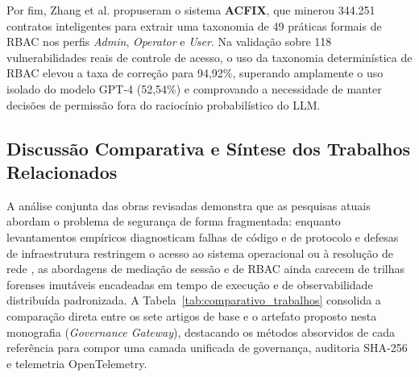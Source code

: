 Por fim, Zhang et al. \cite{zhang2025acfix} propuseram o sistema \textbf{ACFIX}, que minerou 344.251 contratos inteligentes para extrair uma taxonomia de 49 práticas formais de RBAC nos perfis \textit{Admin}, \textit{Operator} e \textit{User}. Na validação sobre 118 vulnerabilidades reais de controle de acesso, o uso da taxonomia determinística de RBAC elevou a taxa de correção para 94,92\%, superando amplamente o uso isolado do modelo GPT-4 (52,54\%) e comprovando a necessidade de manter decisões de permissão fora do raciocínio probabilístico do LLM.

\subsection{Discussão Comparativa e Síntese dos Trabalhos Relacionados}
\label{subsec:rel_discussao}

A análise conjunta das obras revisadas demonstra que as pesquisas atuais abordam o problema de segurança de forma fragmentada: enquanto levantamentos empíricos diagnosticam falhas de código e de protocolo \cite{hasan2026mcp,guo2025measurement,hou2025mcp} e defesas de infraestrutura restringem o acesso ao sistema operacional ou à resolução de rede \cite{jang2026hierarchical,buhler2026agentbound}, as abordagens de mediação de sessão e de RBAC \cite{singh2026mcpsecure,zhang2025acfix} ainda carecem de trilhas forenses imutáveis encadeadas em tempo de execução e de observabilidade distribuída padronizada. A Tabela~\ref{tab:comparativo_trabalhos} consolida a comparação direta entre os sete artigos de base e o artefato proposto nesta monografia (\textit{Governance Gateway}), destacando os métodos absorvidos de cada referência para compor uma camada unificada de governança, auditoria SHA-256 e telemetria OpenTelemetry.

